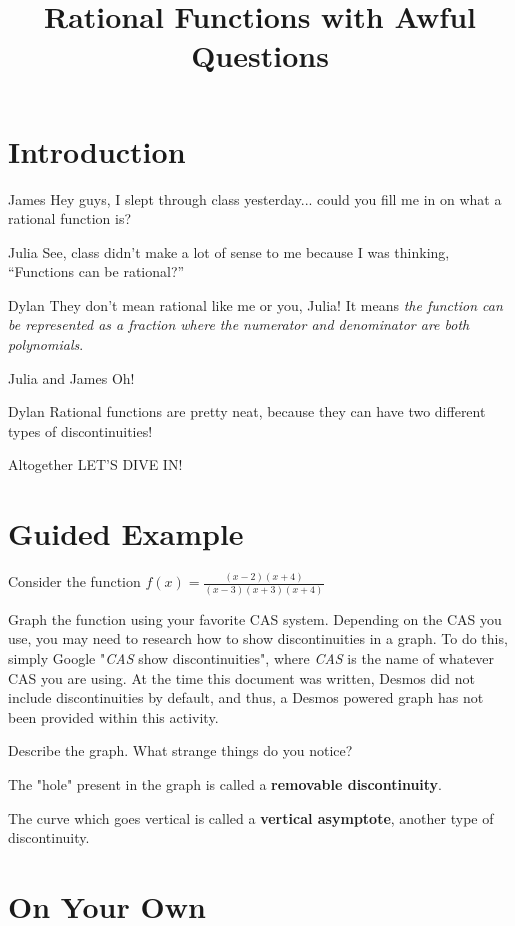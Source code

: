 \documentclass{ximera}
\title{Rational Functions with Awful Questions}
\begin{document}
\maketitle
\section{Introduction}
\begin{dialogue}
\item[James] Hey guys, I slept through class yesterday... could you fill me in on what a rational function is?
\item[Julia] See, class didn't make a lot of sense to me because I was thinking, ``Functions can be rational?''
\item[Dylan] They don't mean rational like me or you, Julia! It means \textit{the function can be represented as a fraction where the numerator and denominator are both polynomials}.
\item[Julia and James] Oh!
\item[Dylan] Rational functions are pretty neat, because they can have two different types of discontinuities!
\item[Altogether] LET'S DIVE IN!
\end{dialogue}
\section{Guided Example}
Consider the function $f(x)=\frac{(x-2)(x+4)}{(x-3)(x+3)(x+4)}$

Graph the function using your favorite CAS system. Depending on the CAS you use, you may need to research how to show discontinuities in a graph. To do this, simply Google "\textit{CAS} show discontinuities", where \textit{CAS} is the name of whatever CAS you are using. At the time this document was written, Desmos did not include discontinuities by default, and thus, a Desmos powered graph has not been provided within this activity.
\begin{question}
Describe the graph. What strange things do you notice?
\begin{freeResponse}
\end{freeResponse}
\end{question}
The "hole" present in the graph is called a \textbf{removable discontinuity}.

The curve which goes vertical is called a \textbf{vertical asymptote}, another type of discontinuity.

\section{On Your Own}
\end{document}
